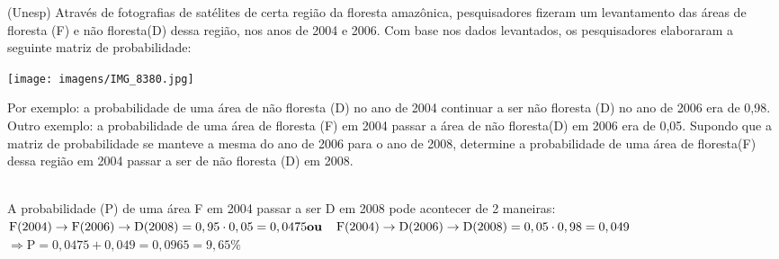 \begin{ex}
(Unesp) Através de fotografias de satélites de certa região da floresta amazônica, pesquisadores fizeram um levantamento das áreas de floresta (F) e não floresta(D) dessa região, nos anos de 2004 e 2006. Com base nos dados levantados, os pesquisadores elaboraram a seguinte matriz de probabilidade:\\
\begin{center}
    \texttt{[image: imagens/IMG\_8380.jpg]}
\end{center}
Por exemplo: a probabilidade de uma área de não floresta (D) no ano de 2004 continuar a ser não floresta (D) no ano de 2006 era de 0,98. Outro exemplo: a probabilidade de uma área de floresta (F) em 2004 passar a área de não floresta(D) em 2006 era de 0,05. Supondo que a matriz de probabilidade se manteve a mesma do ano de 2006 para o ano de 2008, determine a probabilidade de uma área de floresta(F) dessa região em 2004 passar a ser de não floresta (D) em 2008.
 \begin{sol}
  \phantom{A} \\
  A probabilidade (P) de uma área F em 2004 passar a ser D em 2008 pode acontecer de 2 maneiras:
  $\text{F}(2004)\rightarrow \text{F}(2006) \rightarrow \text{D}(2008)= 0,95\cdot0,05=0,0475\\
  \textbf{ou}\hspace{0,4cm} \text{F}(2004)\rightarrow \text{D}(2006) \rightarrow \text{D}(2008)= 0,05\cdot0,98=0,049$ \\
  $\Longrightarrow \text{P}=0,0475+0,049=0,0965=9,65\%$
 \end{sol}
\end{ex}